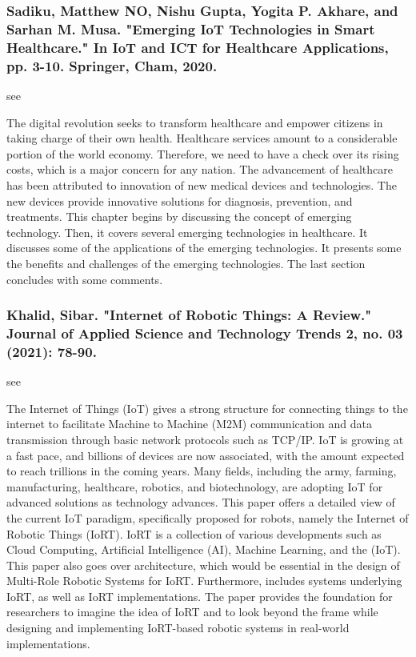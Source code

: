 \documentclass[conference]{IEEEtran}
\begin{document}
\medskip
\subsubsection{Sadiku, Matthew NO, Nishu Gupta, Yogita P. Akhare, and Sarhan M. Musa. "Emerging IoT Technologies in Smart Healthcare." In IoT and ICT for Healthcare Applications, pp. 3-10. Springer, Cham, 2020.}
see \cite{sadiku2020emerging}

The digital revolution seeks to transform healthcare and empower citizens in taking charge of their own health. Healthcare services amount to a considerable portion of the world economy. Therefore, we need to have a check over its rising costs, which is a major concern for any nation. The advancement of healthcare has been attributed to innovation of new medical devices and technologies. The new devices provide innovative solutions for diagnosis, prevention, and treatments. This chapter begins by discussing the concept of emerging technology. Then, it covers several emerging technologies in healthcare. It discusses some of the applications of the emerging technologies. It presents some the benefits and challenges of the emerging technologies. The last section concludes with some comments.

\medskip
\subsubsection{Khalid, Sibar. "Internet of Robotic Things: A Review." Journal of Applied Science and Technology Trends 2, no. 03 (2021): 78-90.}
see \cite{khalid2021internet}

The  Internet  of  Things  (IoT)  gives  a strong  structure  for  connecting  things  to  the  internet  to  facilitate  Machine  to  Machine  (M2M) communication and data transmission through basic network protocols such as TCP/IP.  IoT is growing at a fast pace, and billions of devices are now associated, with the amount expected to reach trillions in the coming years. Many fields, including the army, farming, manufacturing,  healthcare,  robotics,  and  biotechnology,  are  adopting  IoT  for  advanced  solutions  as  technology  advances.  This paper offers a detailed view of the current IoT paradigm, specifically proposed for robots, namely the Internet of Robotic Things (IoRT). IoRT is a collection of various developments such as Cloud Computing, Artificial Intelligence (AI), Machine Learning, and the (IoT). This paper also goes over architecture, which would be essential in the design of Multi-Role Robotic Systems for IoRT. Furthermore, includes systems underlying IoRT, as well as IoRT implementations.  The paper provides the foundation for researchers to imagine the idea of IoRT and to look beyond the frame while designing and implementing IoRT-based robotic systems in real-world implementations.
\end{document}

